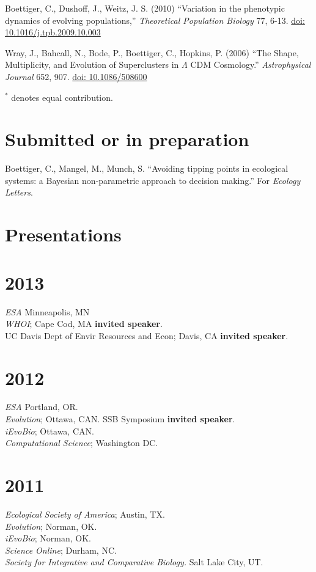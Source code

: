 \documentclass[margin]{res}
\begin{document}
\begin{resume}
\begin{etaremune}[start = 11]
\item Boettiger, C., Dushoff, J., Weitz, J. S. (2010) ``Variation in the phenotypic dynamics of evolving populations,'' {\it Theoretical Population Biology} 77, 6-13. \href{http://dx.doi.org/10.1016/j.tpb.2009.10.003}{doi: 10.1016/j.tpb.2009.10.003}
\item Wray, J., Bahcall, N., Bode, P., Boettiger, C., Hopkins, P.  (2006)  ``The Shape, Multiplicity, and Evolution of Superclusters in $\Lambda$ CDM Cosmology.''  {\it Astrophysical Journal} 652, 907. \href{http://dx.doi.org/10.1086/508600}{doi: 10.1086/508600}
\end{etaremune}
{ \footnotesize $^*$ denotes equal contribution.}

\section{Submitted or in preparation}


\begin{etaremune}[start = 1]
\item  Boettiger, C., Mangel, M., Munch, S. ``Avoiding tipping points in ecological systems: a Bayesian non-parametric approach to decision making.'' For {\it Ecology Letters}. 
\end{etaremune}


\section{Presentations} 
\section{\textnormal{2013}}
  \emph{ESA} Minneapolis, MN \\ 
  \emph{WHOI}; Cape Cod, MA \textbf{invited speaker}.\\
  UC Davis Dept of Envir Resources and Econ; Davis, CA \textbf{invited speaker}.\\
\section{\textnormal{2012}}
  \emph{ESA} Portland, OR. \\ 
  \emph{Evolution}; Ottawa, CAN. SSB Symposium \textbf{invited speaker}.\\
  \emph{iEvoBio}; Ottawa, CAN. \\
  \emph{Computational Science}; Washington DC. 
\section{\textnormal{2011}}
  \emph{Ecological Society of America}; Austin, TX. \\
  \emph{Evolution}; Norman, OK. \\
  \emph{iEvoBio}; Norman, OK. \\
  \emph{Science Online}; Durham, NC.\\
  \emph{Society for Integrative and Comparative Biology.} Salt Lake City, UT. \\

\end{resume}
\end{document}

